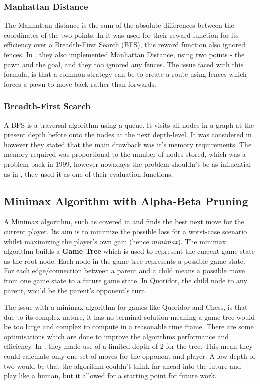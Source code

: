 \documentclass[review]{cmpreport}
\begin{document}
\subsubsection{Manhattan Distance}
The Manhattan distance is the sum of the absolute differences between the coordinates of the two points. In \cite{josequoridor} it was used for their reward function for its efficiency over a Breadth-First Search (BFS), this reward function also ignored fences. In \cite{glendenning2005mastering}, they also implemented Manhattan Distance, using two points - the pawn and the goal, and they too ignored any fences. The issue faced with this formula, is that a common strategy can be to create a route using fences which forces a pawn to move back rather than forwards.

\subsubsection{Breadth-First Search}
A BFS is a traversal algorithm using a queue. It visits all nodes in a graph at the present depth before onto the nodes at the next depth-level. It was considered in \cite{korf1999artificial} however they stated that the main drawback was it's memory requirements. The memory required was proportional to the number of nodes stored, which was a problem back in 1999, however nowadays the problem shouldn't be as influential as in \cite{josequoridor}, they used it as one of their evaluation functions.

\subsection{Minimax Algorithm with Alpha-Beta Pruning}
A Minimax algorithm, such as covered in \cite{plaat1996best} and \cite{strong2011minimax} finds the best next move for the current player. Its aim is to minimize the possible loss for a worst-case scenario whilst maximizing the player's own gain (hence \textit{minimax}). The minimax algorithm builds a \textbf{Game Tree} which is used to represent the current game state as the root node. Each node in the game tree represents a possible game state. For each edge/connection between a parent and a child means a possible move from one game state to a future game state. In Quoridor, the child node to any parent, would be the parent's opponent's turn.\newline

\noindent The issue with a minimax algorithm for games like Quoridor and Chess, is that due to its complex nature, it has no terminal solution meaning a game tree would be too large and complex to compute in a reasonable time frame. There are some optimisations which are done to improve the algorithms performance and efficiency. In \cite{josequoridor}, they made use of a limited depth of 2 for the tree. This mean they could calculate only one set of moves for the opponent and player. A low depth of two would be that the algorithm couldn't think far ahead into the future and play like a human, but it allowed for a starting point for future work. 
\end{document}
